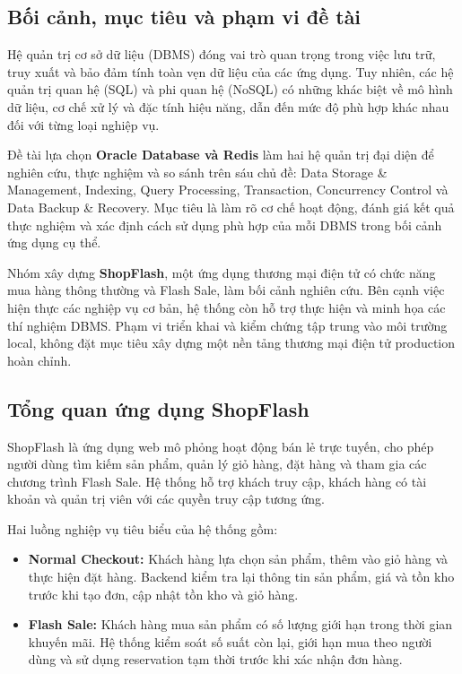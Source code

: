 \subsection{Bối cảnh, mục tiêu và phạm vi đề tài}
Hệ quản trị cơ sở dữ liệu (DBMS) đóng vai trò quan trọng trong việc lưu trữ, truy xuất và bảo đảm tính toàn vẹn dữ liệu của các ứng dụng. Tuy nhiên, các hệ quản trị quan hệ (SQL) và phi quan hệ (NoSQL) có những khác biệt về mô hình dữ liệu, cơ chế xử lý và đặc tính hiệu năng, dẫn đến mức độ phù hợp khác nhau đối với từng loại nghiệp vụ.

Đề tài lựa chọn \textbf{Oracle Database và Redis} làm hai hệ quản trị đại diện để nghiên cứu, thực nghiệm và so sánh trên sáu chủ đề: Data Storage \& Management, Indexing, Query Processing, Transaction, Concurrency Control và Data Backup \& Recovery. Mục tiêu là làm rõ cơ chế hoạt động, đánh giá kết quả thực nghiệm và xác định cách sử dụng phù hợp của mỗi DBMS trong bối cảnh ứng dụng cụ thể.

Nhóm xây dựng \textbf{ShopFlash}, một ứng dụng thương mại điện tử có chức năng mua hàng thông thường và Flash Sale, làm bối cảnh nghiên cứu. Bên cạnh việc hiện thực các nghiệp vụ cơ bản, hệ thống còn hỗ trợ thực hiện và minh họa các thí nghiệm DBMS. Phạm vi triển khai và kiểm chứng tập trung vào môi trường local, không đặt mục tiêu xây dựng một nền tảng thương mại điện tử production hoàn chỉnh.

\subsection{Tổng quan ứng dụng ShopFlash}
ShopFlash là ứng dụng web mô phỏng hoạt động bán lẻ trực tuyến, cho phép người dùng tìm kiếm sản phẩm, quản lý giỏ hàng, đặt hàng và tham gia các chương trình Flash Sale. Hệ thống hỗ trợ khách truy cập, khách hàng có tài khoản và quản trị viên với các quyền truy cập tương ứng.

Hai luồng nghiệp vụ tiêu biểu của hệ thống gồm:

\begin{itemize}[leftmargin=1.3em,itemsep=2pt,topsep=3pt]
\item
\textbf{Normal Checkout:} Khách hàng lựa chọn sản phẩm, thêm vào giỏ hàng và thực hiện đặt hàng. Backend kiểm tra lại thông tin sản phẩm, giá và tồn kho trước khi tạo đơn, cập nhật tồn kho và giỏ hàng.

\item
\textbf{Flash Sale:} Khách hàng mua sản phẩm có số lượng giới hạn trong thời gian khuyến mãi. Hệ thống kiểm soát số suất còn lại, giới hạn mua theo người dùng và sử dụng reservation tạm thời trước khi xác nhận đơn hàng.

\end{itemize}

